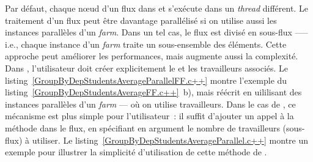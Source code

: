 Par d\'efaut, chaque nœud d'un flux dans  et  s'ex\'ecute dans un \emph{thread} diff\'erent. Le traitement d'un flux peut \^etre davantage parall\'elis\'e si on utilise aussi les instances parall\`eles d'un \emph{farm}. Dans un tel cas, le flux est divis\'e en sous-flux —-- i.e., chaque instance d'un \emph{farm} traite un sous-ensemble des \'el\'ements. Cette approche peut améliorer les performances, mais augmente aussi la complexit\'e. Dans , l'utilisateur doit cr\'eer explicitement le  et les travailleurs associés. Le listing~\ref{GroupByDepStudentsAverageParallelFF.c++} montre l'exemple du listing~\ref{GroupByDepStudentsAverageFF.c++}~b), mais réécrit en uililisant des instances parall\`eles d'un \emph{farm} --- où on utilise  travailleurs. Dans le cas de , ce m\'ecanisme est plus simple pour l'utilisateur~: il suffit d'ajouter un appel à  la m\'ethode  dans le flux, en sp\'ecifiant en argument le nombre de travailleurs (sous-flux) \`a utiliser. Le listing~\ref{GroupByDepStudentsAverageParallel.c++} montre un exemple pour illustrer la simplicit\'e d'utilisation de cette méthode de .




